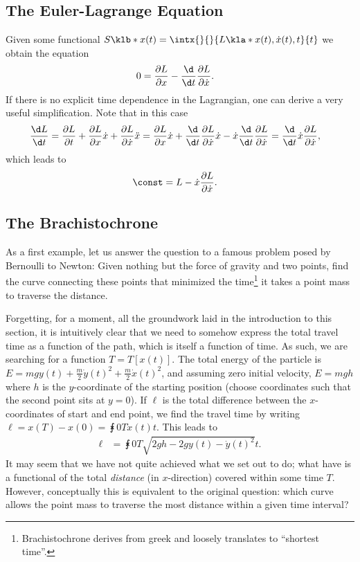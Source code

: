 \documentclass[english, parskip=full]{scrartcl}
\begin{document}
\subsection{The Euler-Lagrange Equation}
Given some functional $S\klb*{x(t)} = \intx{ }{ }{L\kla*{x(t),\dot{x}(t),t}}{t}$ we obtain the equation
\begin{align}
0 &= \frac{\partial L}{\partial x} - \frac{\d}{\d t} \frac{\partial L}{\partial \dot{x}}.
\end{align}
If there is no explicit time dependence in the Lagrangian, one can derive a very useful simplification.
Note that in this case
\begin{align}
\frac{\d L}{\d t} &= \frac{\partial L}{\partial t} + \frac{\partial L}{\partial x} \dot{x} + \frac{\partial L}{\partial \dot{x}} \ddot{x} = \frac{\partial L}{\partial x} \dot{x} + \frac{\d }{\d t} \frac{\partial L}{\partial \dot{x}} \dot{x} - \dot{x} \frac{\d}{\d t} \frac{\partial L}{\partial \dot{x}} = \frac{\d}{\d t} \dot{x} \frac{\partial L}{\partial \dot{x}},
\end{align}
which leads to
\begin{align}
\const &= L - \dot{x} \frac{\partial L}{\partial \dot{x}}.
\end{align}
\subsection{The Brachistochrone}
As a first example, let us answer the question to a famous problem posed by Bernoulli to Newton:
Given nothing but the force of gravity and two points, find the curve connecting these points that minimized the time\footnote{Brachistochrone derives from greek and loosely translates to ``shortest time''.} it takes a point mass to traverse the distance.

Forgetting, for a moment, all the groundwork laid in the introduction to this section, it is intuitively clear that we need to somehow express the total travel time as a function of the path, which is itself a function of time.
As such, we are searching for a function $T=T[x(t)]$.
The total energy of the particle is $E=mgy(t) + \frac{m}{2}\dot{y}(t)^2 + \frac{m}{2}\dot{x}(t)^2$, and assuming zero initial velocity, $E=mgh$ where $h$ is the $y$-coordinate of the starting position (choose coordinates such that the second point sits at $y=0$).
If $\ell$ is the total difference between the $x$-coordinates of start and end point, we find the travel time by writing $\ell = x(T) - x(0) = \intx{0}{T}{\dot{x}(t)}{t}$.
This leads to
\begin{align}
\ell &= \intx{0}{T}{ \sqrt{2gh - 2gy(t) - \dot{y}(t)^2} }{t}.
\end{align}
It may seem that we have not quite achieved what we set out to do; what have is a functional of the total \emph{distance} (in $x$-direction) covered within some time $T$.
However, conceptually this is equivalent to the original question: which curve allows the point mass to traverse the most distance within a given time interval?
\end{document}
